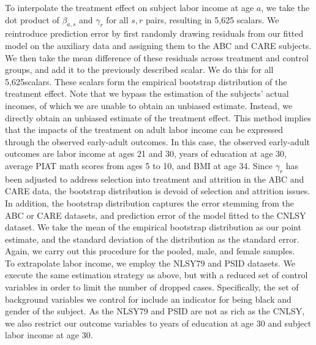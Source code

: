 \noindent To interpolate the treatment effect on subject labor income at age $a$, we take the dot product
of $\beta_{a, s}$ and $\gamma_r$ for all $s,r$ pairs, resulting in 5,625 scalars. We reintroduce
prediction error by first randomly drawing residuals from our fitted model on the auxiliary data and assigning
them to the ABC and CARE subjects. We then take the mean difference of these residuals across treatment and control
groups, and add it to the previously described scalar. We do this for all 5,625scalars. These scalars form the empirical
bootstrap distribution of the treatment effect. Note that
we bypass the estimation of the subjects' actual incomes, of which we are unable to obtain an
unbiased estimate. Instead, we directly obtain an unbiased estimate of the treatment effect. This
method implies that the impacts of the treatment on adult labor income can be expressed through
the observed early-adult outcomes. In this case, the observed early-adult outcomes are labor income at ages 21 and
30, years of education at age 30, average PIAT math scores from ages 5 to 10, and BMI at age 34. Since $\gamma_r$ has
been adjusted to address selection into treatment and attrition in the ABC and CARE data, the bootstrap distribution
is devoid of selection and attrition issues. In addition, the bootstrap distribution captures
the error stemming from the ABC or CARE datasets, and prediction error of the model fitted to the CNLSY dataset.
We take the mean of the empirical bootstrap distribution as our point estimate, and the standard deviation
of the distribution as the standard error. Again, we carry out this procedure for the
pooled, male, and female samples. \\

\noindent To extrapolate labor income, we employ the NLSY79 and PSID datasets. We execute the same estimation
strategy as above, but with a reduced set of control variables in order to limit the number
of dropped cases. Specifically, the set of background variables we control for include an indicator for
being black and gender of the subject. As the NLSY79 and PSID are not as rich as the CNLSY, we also
restrict our outcome variables to years of education at age 30 and subject labor income at age 30. \\

